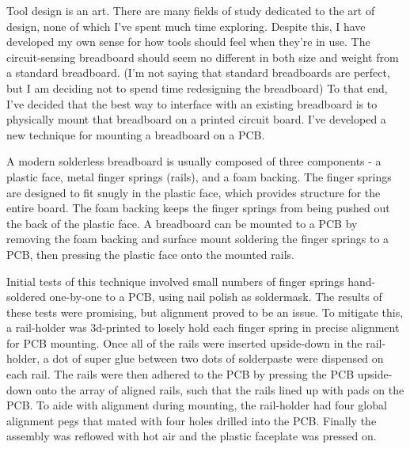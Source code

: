 \documentclass[11pt, a4paper]{article}
\begin{document}
Tool design is an art.
There are many fields of study dedicated to the art of design, none of which I've spent much time exploring.
Despite this, I have developed my own sense for how tools should feel when they're in use.
The circuit-sensing breadboard should seem no different in both size and weight from a standard breadboard.
(I'm not saying that standard breadboards are perfect, but I am deciding not to spend time redesigning the breadboard)
To that end, I've decided that the best way to interface with an existing breadboard is to physically mount that breadboard on a printed circuit board.
I've developed a new technique for mounting a breadboard on a PCB.

A modern solderless breadboard is usually composed of three components - a plastic face, metal finger springs (rails), and a foam backing.
The finger springs are designed to fit snugly in the plastic face, which provides structure for the entire board.
The foam backing keeps the finger springs from being pushed out the back of the plastic face.
A breadboard can be mounted to a PCB by removing the foam backing and surface mount soldering the finger springs to a PCB, then pressing the plastic face onto the mounted rails.

Initial tests of this technique involved small numbers of finger springs hand-soldered one-by-one to a PCB, using nail polish as soldermask.
The results of these tests were promising, but alignment proved to be an issue.
To mitigate this, a rail-holder was 3d-printed to losely hold each finger spring in precise alignment for PCB mounting.
Once all of the rails were inserted upside-down in the rail-holder, a dot of super glue between two dots of solderpaste were dispensed on each rail.
The rails were then adhered to the PCB by pressing the PCB upside-down onto the array of aligned rails, such that the rails lined up with pads on the PCB. 
To aide with alignment during mounting, the rail-holder had four global alignment pegs that mated with four holes drilled into the PCB.
Finally the assembly was reflowed with hot air and the plastic faceplate was pressed on.
\end{document}
